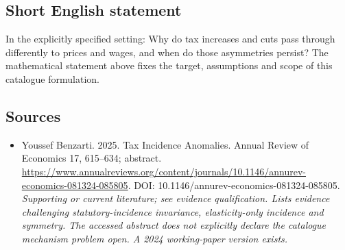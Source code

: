 \documentclass[11pt]{article}
\begin{document}
\subsection{Short English statement}
In the explicitly specified setting: Why do tax increases and cuts pass through differently to prices and wages, and when do those asymmetries persist? The mathematical statement above fixes the target, assumptions and scope of this catalogue formulation.

\subsection{Sources}
\begin{itemize}\raggedright
\item[\textnormal{[S1]}]\hypertarget{source:30007758:1}{} Youssef Benzarti. 2025. Tax Incidence Anomalies. Annual Review of Economics 17, 615–634; abstract.
\url{https://www.annualreviews.org/content/journals/10.1146/annurev-economics-081324-085805}.
DOI: 10.1146/annurev-economics-081324-085805.
{\small\textit{Supporting or current literature; see evidence qualification. Lists evidence challenging statutory-incidence invariance, elasticity-only incidence and symmetry. The accessed abstract does not explicitly declare the catalogue mechanism problem open. A 2024 working-paper version exists.}}
\end{itemize}
\end{document}
